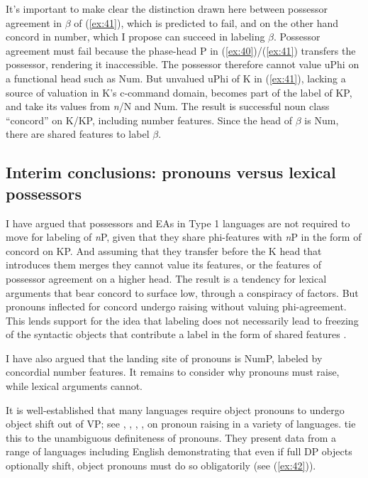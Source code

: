 \documentclass[output=paper
,modfonts
,nonflat]{langsci/langscibook}
\begin{document}
It’s important to make clear the distinction drawn here between possessor agreement in $\beta$ of (\ref{ex:41}), which is predicted to fail, and on the other hand concord in number, which I propose can succeed in labeling $\beta$. Possessor agreement must fail because the phase-head P in (\ref{ex:40})/(\ref{ex:41}) transfers the possessor, rendering it inaccessible. The possessor therefore cannot value uPhi on a functional head such as Num. But unvalued uPhi of K in (\ref{ex:41}), lacking a source of valuation in K’s c-command domain, becomes part of the label of KP, and take its values from \textit{n}/N and Num. The result is successful noun class “concord” on K/KP, including number features. Since the head of $\beta$ is Num, there are shared features to label $\beta$.  

\subsection{Interim conclusions: pronouns versus lexical possessors} \label{sec:5.4}
I have argued that possessors and EAs in Type 1 languages are not required to move for labeling of \textit{n}P, given that they share phi-features with \textit{n}P in the form of concord on KP. And assuming that they transfer before the K head that introduces them merges they cannot value its features, or the features of possessor agreement on a higher head. The result is a tendency for lexical arguments that bear concord to surface low, through a conspiracy of factors. But pronouns inflected for concord undergo raising without valuing phi-agreement. This lends support for the idea that labeling does not necessarily lead to freezing of the syntactic objects that contribute a label in the form of shared features \citep{Chomsky2015}. 

I have also argued that the landing site of pronouns is NumP, labeled by concordial number features. It remains to consider why pronouns must raise, while lexical arguments cannot. 

It is well-established that many languages require object pronouns to undergo object shift out of VP; see \citet{Diesing1992, Diesing1997}, \citet{Diesing_Jelinek1995}, \citet{Roberts_Shlonsky1996}, \citet{Cardinaletti_Starke1999}, \citet{Holmberg1999} on pronoun raising in a variety of languages.  \citet{Diesing_Jelinek1995} tie this to the unambiguous definiteness of pronouns. They present data from a range of languages including English demonstrating that even if full DP objects optionally shift, object pronouns must do so obligatorily (see (\ref{ex:42})). 
\end{document}
